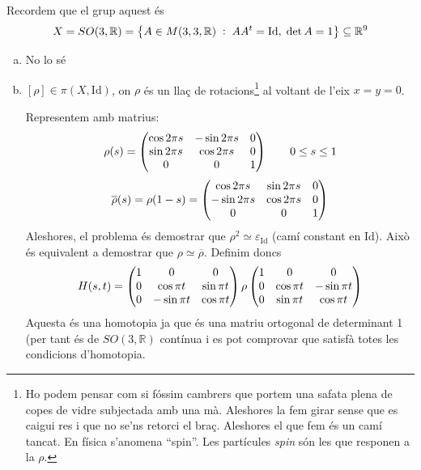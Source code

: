 \documentclass[../main.tex]{subfiles}
\begin{document}
\begin{sol}
Recordem que el grup aquest és
\begin{equation}
    \notag
    X = SO(3,\mathbb{R}) = \left\{A\in M(3,3,\mathbb{R})\;:\;AA^t=\mathrm{Id},\;\det A=1\right\}\subseteq\mathbb{R}^9
\end{equation}
\begin{enumerate}[(a)]
    \item No lo sé
    \item $[\rho]\in\pi(X,\mathrm{Id})$, on $\rho$ és un llaç de rotacions\footnote{Ho podem pensar com si fóssim cambrers que portem una safata plena de copes de vidre subjectada amb una mà. Aleshores la fem girar sense que es caigui res i que no se'ns retorci el braç. Aleshores el que fem és un camí tancat. En física s'anomena ``spin''. Les partícules \textit{spin} són les que responen a la $\rho$.} al voltant de l'eix $x=y=0$. 
    
    Representem amb matrius:
    \begin{equation}
        \notag
        \rho(s) = \begin{pmatrix}
        \cos 2\pi s & -\sin 2\pi s & 0 \\
        \sin 2\pi s & \cos 2\pi s & 0 \\
        0 & 0 & 1
        \end{pmatrix}
        \qquad 0\leq s\leq 1
    \end{equation}
    \begin{equation}
        \notag
        \overline{\rho}(s) = \rho(1-s)= \begin{pmatrix}
        \cos 2\pi s & \sin 2\pi s & 0 \\
        -\sin 2\pi s & \cos 2\pi s & 0 \\
        0 & 0 & 1
        \end{pmatrix}
    \end{equation}
    Aleshores, el problema és demostrar que $\rho^2\simeq \varepsilon_{\mathrm{Id}}$ (camí constant en Id). Això és equivalent a demostrar que $\rho\simeq \overline{\rho}$. Definim doncs
    \begin{equation}
        \notag
        H(s,t) = \begin{pmatrix}
        1 & 0 & 0 \\
        0 & \cos\pi t & \sin\pi t \\
        0 & -\sin\pi t & \cos \pi t
        \end{pmatrix} \rho \begin{pmatrix}
        1 & 0 & 0 \\
        0 & \cos\pi t & -\sin\pi t \\
        0 & \sin\pi t & \cos \pi t
        \end{pmatrix}
    \end{equation}
    Aquesta és una homotopia ja que és una matriu ortogonal de determinant 1 (per tant és de $SO(3,\mathbb{R})$ contínua i es pot comprovar que satisfà totes les condicions d'homotopia.
\end{enumerate}
\end{sol}
\end{document}
